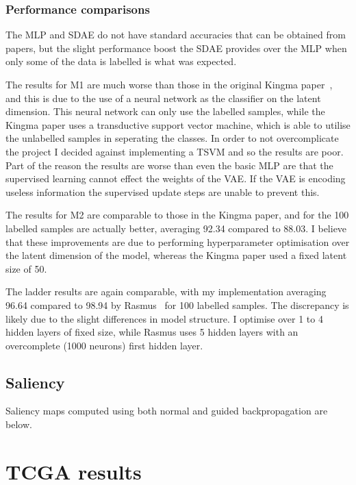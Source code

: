 \subsubsection{Performance comparisons}
The MLP and SDAE do not have standard accuracies that can be obtained from papers, but the slight performance boost the SDAE provides 
over the MLP when only some of the data is labelled is what was expected.

The results for M1 are much worse than those in the original Kingma paper~\cite{DBLP:journals/corr/KingmaRMW14}, and this is due to the use
of a neural network as the classifier on the latent dimension. This neural network can only use the labelled samples, while the Kingma 
paper uses a transductive support vector machine, which is able to utilise the unlabelled samples in seperating the classes. In order to
not overcomplicate the project I decided against implementing a TSVM and so the results are poor. Part of the reason the results are worse 
than even the basic MLP are that the supervised learning cannot effect the weights of the VAE. If the VAE is encoding useless information 
the supervised update steps are unable to prevent this.

The results for M2 are comparable to those in the Kingma paper, and for the 100 labelled samples are actually better, averaging 92.34 
compared to 88.03. I believe that these improvements are due to performing hyperparameter optimisation over the latent dimension of the 
model, whereas the Kingma paper used a fixed latent size of 50.

The ladder results are again comparable, with my implementation averaging 96.64 compared to 98.94 by Rasmus~\cite{DBLP:journals/corr/RasmusVHBR15}
for 100 labelled samples.
The discrepancy is likely due to the slight differences in model structure. I optimise over 1 to 4 hidden layers of fixed size,
while Rasmus uses 5 hidden layers with an overcomplete (1000 neurons) first hidden layer.

\subsection{Saliency}

Saliency maps computed using both normal and guided backpropagation are below.

\section{TCGA results}

